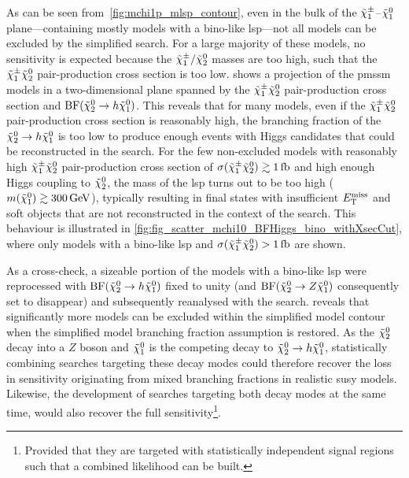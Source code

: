 As can be seen from~\cref{fig:mchi1p_mlsp_contour}, even in the bulk of the $\tilde{\chi}_1^\pm$--$\tilde{\chi}_1^0$ plane---containing mostly models with a bino-like \gls{lsp}---not all models can be excluded by the simplified \onelepton search. For a large majority of these models, no sensitivity is expected because the $\tilde{\chi}_1^\pm/\tilde{\chi}_2^0$ masses are too high, such that the $\tilde{\chi}_1^\pm\tilde{\chi}_2^0$ pair-production cross section is too low.  shows a projection of the \gls{pmssm} models in a two-dimensional plane spanned by the $\tilde{\chi}_1^\pm\tilde{\chi}_2^0$ pair-production cross section and $\mathrm{BF}(\tilde{\chi}_2^0 \rightarrow h \tilde{\chi}_1^0)$.
This reveals that for many models, even if the  $\tilde{\chi}_1^\pm\tilde{\chi}_2^0$ pair-production cross section is reasonably high, the branching fraction of the $\tilde{\chi}_2^0 \rightarrow h \tilde{\chi}_1^0$ is too low to produce enough events with Higgs candidates that could be reconstructed in the \onelepton search.
For the few non-excluded models with reasonably high $\tilde{\chi}_1^\pm\tilde{\chi}_2^0$ pair-production cross section of $\sigma(\charg\neutr) \gtrsim\SI{1}{\femto\barn}$ and high enough Higgs coupling to $\tilde{\chi}_2^0$, the mass of the \gls{lsp} turns out to be too high ($m(\lsp)\gtrsim \SI{300}{\GeV}$), typically resulting in final states with insufficient $E_{\textrm{T}}^{\textrm{miss}}$ and soft objects that are not reconstructed in the context of the \onelepton search. This behaviour is illustrated in \cref{fig:fig_scatter_mchi10_BFHiggs_bino_withXsecCut}, where only models with a bino-like \gls{lsp} and $\sigma(\charg\neutr) > \SI{1}{\femto\barn}$ are shown. 

As a cross-check, a sizeable portion of the models with a bino-like \gls{lsp} were reprocessed with $\mathrm{BF}(\tilde{\chi}_2^0 \rightarrow h \tilde{\chi}_1^0)$ fixed to unity (and $\mathrm{BF}(\tilde{\chi}_2^0 \rightarrow Z \tilde{\chi}_1^0)$ consequently set to disappear) and subsequently reanalysed with the \onelepton search.
 reveals that significantly more models can be excluded within the simplified model contour when the simplified model branching fraction assumption is restored. As the $\tilde{\chi}_2^0$ decay into a $Z$ boson and $\tilde{\chi}_1^0$ is the competing decay to $\tilde{\chi}_2^0 \rightarrow h \tilde{\chi}_1^0$, statistically combining searches targeting these decay modes could therefore recover the loss in sensitivity originating from mixed branching fractions in realistic \gls{susy} models. Likewise, the development of searches targeting both decay modes at the same time, would also recover the full sensitivity\footnote{Provided that they are targeted with statistically independent signal regions such that a combined likelihood can be built.}.  

